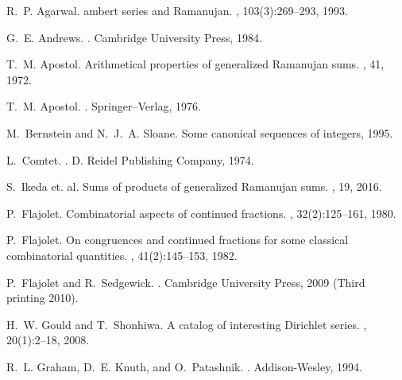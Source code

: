 \documentclass[12pt,reqno,a4letter]{article}
\numberwithin{figure}{section}
\numberwithin{table}{section}
\numberwithin{equation}{section}
\theoremstyle{plain}
\numberwithin{theorem}{section}
\theoremstyle{definition}
\begin{document}
\newpage 
\renewcommand{\refname}{References} 
\addcontentsline{toc}{section}{\refname}


\begin{thebibliography}{10}

R.~P. Agarwal.
ambert series and {R}amanujan.
, 103(3):269--293, 1993.

G.~E. Andrews.
.
\newblock Cambridge University Press, 1984.

T.~M. Apostol.
\newblock Arithmetical properties of generalized {R}amanujan sums.
, 41, 1972.

T.~M. Apostol.
.
\newblock Springer--Verlag, 1976.

M.~Bernstein and N.~J.~A. Sloane.
\newblock Some canonical sequences of integers, 1995.

L.~Comtet.
.
\newblock D. Reidel Publishing Company, 1974.

S.~Ikeda et. al.
\newblock Sums of products of generalized {R}amanujan sums.
, 19, 2016.

P.~Flajolet.
\newblock Combinatorial aspects of continued fractions.
, 32(2):125--161, 1980.

P.~Flajolet.
\newblock On congruences and continued fractions for some classical
  combinatorial quantities.
, 41(2):145--153, 1982.

P.~Flajolet and R.~Sedgewick.
.
\newblock Cambridge University Press, 2009 (Third printing 2010).

H.~W. Gould and T.~Shonhiwa.
\newblock A catalog of interesting {D}irichlet series.
, 20(1):2--18, 2008.

R.~L. Graham, D.~E. Knuth, and O.~Patashnik.
.
\newblock Addison-Wesley, 1994.


\end{thebibliography}
\end{document}
